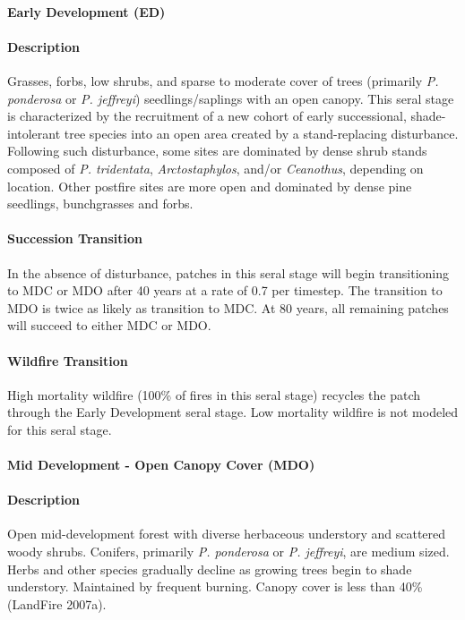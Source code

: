\paragraph{Early Development (ED)}

\paragraph{Description} Grasses, forbs, low shrubs, and sparse to moderate cover of trees (primarily \emph{P. ponderosa} or \emph{P. jeffreyi}) seedlings/saplings with an open canopy. This seral stage is characterized by the recruitment of a new cohort of early successional, shade-intolerant tree species into an open area created by a stand-replacing disturbance. Following such disturbance, some sites are dominated by dense shrub stands composed of \emph{P. tridentata}, \emph{Arctostaphylos}, and/or \emph{Ceanothus}, depending on location. Other postfire sites are more open and dominated by dense pine seedlings, bunchgrasses and forbs.

\paragraph{Succession Transition} In the absence of disturbance, patches in this seral stage will begin transitioning to MDC or MDO after 40 years at a rate of 0.7 per timestep. The transition to MDO is twice as likely as transition to MDC.  At 80 years, all remaining patches will succeed to either MDC or MDO. 

\paragraph{Wildfire Transition} High mortality wildfire (100\% of fires in this seral stage) recycles the patch through the Early Development seral stage. Low mortality wildfire is not modeled for this seral stage. 

\noindent\hrulefill


\paragraph{Mid Development - Open Canopy Cover (MDO)}

\paragraph{Description} Open mid-development forest with diverse herbaceous understory and scattered woody shrubs. Conifers, primarily \emph{P. ponderosa} or \emph{P. jeffreyi}, are medium sized. Herbs and other species gradually decline as growing trees begin to shade understory. Maintained by frequent burning. Canopy cover is less than 40\% (LandFire 2007a). 

